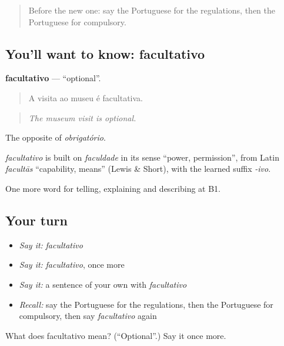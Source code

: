 \begin{quote}
Before the new one: say the Portuguese for the regulations, then the Portuguese for compulsory.
\end{quote}

\subsection*{You'll want to know: facultativo}
\textbf{facultativo} — \textquotedblleft{}optional\textquotedblright{}.

\begin{quote}
A visita ao museu é facultativa.
\end{quote}

\begin{quote}
\emph{The museum visit is optional.}
\end{quote}

The opposite of \emph{obrigatório}.

\begin{cousinweb}
\emph{facultativo} is built on \emph{faculdade} in its sense \textquotedblleft{}power, permission\textquotedblright{}, from Latin \emph{facultās} \textquotedblleft{}capability, means\textquotedblright{} (Lewis \& Short), with the learned suffix \emph{-ivo}.
\end{cousinweb}

\begin{grammarlens}[title={What you've built}]
One more word for telling, explaining and describing at B1.
\end{grammarlens}

\subsection*{Your turn}
\begin{itemize}
\raggedright
  \item \emph{Say it:} \emph{facultativo}
  \item \emph{Say it:} \emph{facultativo}, once more
  \item \emph{Say it:} a sentence of your own with \emph{facultativo}
  \item \emph{Recall:} say the Portuguese for the regulations, then the Portuguese for compulsory, then say \emph{facultativo} again
\end{itemize}

\begin{tcolorbox}[breakable,colback=teal!4,colframe=teal!35!black,title={Before you move on}]
What does facultativo mean? (\textquotedblleft{}Optional\textquotedblright{}.) Say it once more.
\end{tcolorbox}
